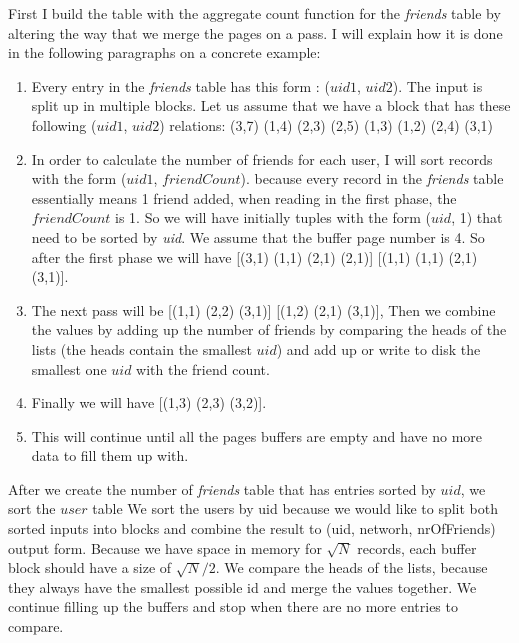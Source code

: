 \documentclass{article}      %
\begin{document}
First I build the table with the aggregate count function for the \emph{friends} table by altering the way that we merge the pages on a pass. I will explain how it is done in the following paragraphs on a concrete example:

\begin{enumerate}
\item 
Every entry in the \emph{friends} table has this form : ($uid1$, $uid2$). The input is split up in multiple blocks. Let us assume that we have a block that has these following ($uid1$, $uid2$) relations:
(3,7) (1,4) (2,3) (2,5) (1,3) (1,2) (2,4) (3,1)
\item
In order to calculate the number of friends for each user, I will sort records with the form ($uid1$, $friendCount$). because every record in the \emph{friends} table essentially means 1 friend added, when reading in the first phase, the $friendCount$ is 1. So we will have initially tuples with the form ($uid$, 1) that need to be sorted by \emph{uid}. We assume that the buffer page number is 4. So after the first phase we will have [(3,1) (1,1) (2,1) (2,1)] [(1,1) (1,1) (2,1) (3,1)]. 
\item
The next pass will be [(1,1) (2,2) (3,1)] [(1,2) (2,1) (3,1)], Then we combine the values by adding up the number of friends by comparing the heads of the lists (the heads contain the smallest $uid$) and add up or write to disk the smallest one $uid$ with the friend count.
\item
Finally we will have [(1,3) (2,3) (3,2)].
\item 
This will continue until all the pages buffers are empty and have no more data to fill them up with. 
\end{enumerate}

After we create the number of \emph{friends} table that has entries sorted by $uid$, we sort the $user$ table We sort the users by uid because we would like to split both sorted inputs into blocks and combine the result to (uid, networh, nrOfFriends) output form. Because we have space in memory for \begin{math}\sqrt{N}\end{math} records, each buffer block should have a size of \begin{math}\sqrt{N}/2\end{math}. We compare the heads of the lists, because they always have the smallest possible id and merge the values together. We continue filling up the buffers and stop when there are no more entries to compare.
  
\end{document}
